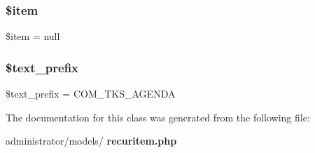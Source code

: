 \subsubsection{\$item}
{\footnotesize\ttfamily \$item = null\hspace{0.3cm}{\ttfamily [protected]}}

\mbox{\label{classtks__agenda_model_recuritem_a5c29c349be0f67f1ca4f94809be602a7}} 
\subsubsection{\$text\+\_\+prefix}
{\footnotesize\ttfamily \$text\+\_\+prefix = \textquotesingle{}C\+O\+M\+\_\+\+T\+K\+S\+\_\+\+A\+G\+E\+N\+DA\textquotesingle{}\hspace{0.3cm}{\ttfamily [protected]}}



The documentation for this class was generated from the following file\+:\begin{DoxyCompactItemize}
\item 
administrator/models/\textbf{ recuritem.\+php}\end{DoxyCompactItemize}
